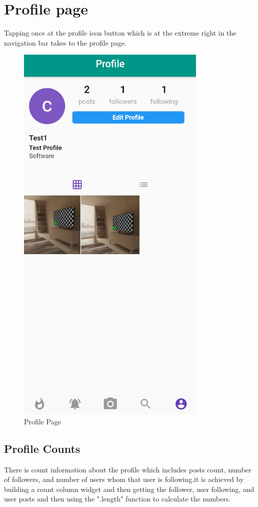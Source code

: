 \section{Profile page}
Tapping once at the profile icon button which is at the extreme right in the navigation bar takes to the profile page.
\begin{figure}[!htb]
    \centering
    \includegraphics[scale=0.80]{AppScreenShots/profile page.PNG}
    \caption{Profile Page}
    \label{fig:Profile Page}
\end{figure}
\subsection{Profile Counts}
There is count information about the profile which includes posts count, number of followers, and number of users whom that user is following.it is achieved by building a count column widget and then getting the follower, user following, and user posts and then using the ".length" function to calculate the numbers.

